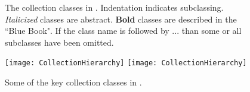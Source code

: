 \documentclass[a4paper,10pt,twoside]{book}
\begin{document}
\begin{figure}
\begin{center}

\caption{The collection classes in \squeak. Indentation indicates subclassing.
\textit{\textsf{Italicized}} classes are abstract.
{\textbf{Bold}} classes are described in the ``Blue Book".
If the class name is followed by ... than some or all subclasses have been omitted.}
\label{fig:CollClassesList}
\end{center}
\end{figure}

\begin{figure}
\begin{center}
\ifluluelse
	{\texttt{[image: CollectionHierarchy]}}
	{\texttt{[image: CollectionHierarchy]}}
\caption{Some of the key collection classes in \squeak.}
\label{fig:CollClassesTree}
\end{center}
\end{figure}
\end{document}
